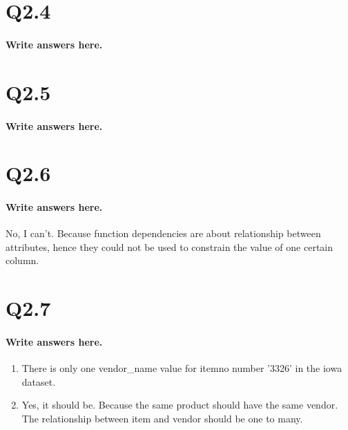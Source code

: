 \documentclass{article}
\begin{document}
\section*{Q2.4}
\paragraph{Write answers here.}


\section*{Q2.5}
\paragraph{Write answers here.}


\section*{Q2.6}
\paragraph{Write answers here.}
No, I can't. Because function dependencies are about relationship between attributes, hence they could not be used to constrain the value of one certain column.

\section*{Q2.7}
\paragraph{Write answers here.}
\begin{enumerate}[label=\alph*]
    \item There is only one vendor\_name value for itemno number '3326' in the iowa dataset.
    \item Yes, it should be. Because the same product should have the same vendor. The relationship between item and vendor should be one to many.
\end{enumerate}

\newpage
\end{document}

